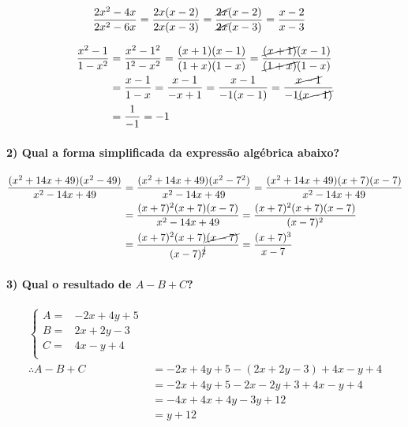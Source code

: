 \documentclass[pdftex, brazil, 12pt, oneside]{article}
\begin{document}
\begin{equation}
  \begin{split}
    \frac{2x^2 - 4x}{2x^2 - 6x} &= \frac{2x(x-2)}{2x(x-3)} = \frac{\cancel{2x}(x-2)}{\cancel{2x}(x-3)} = \frac{x-2}{x-3}
  \end{split}
\end{equation}

\begin{equation}
  \begin{split}
    \frac{x^2 - 1}{1- x^2} &= \frac{x^2 - 1^2}{1^2 - x^2} = \frac{(x+1)(x-1)}{(1+x)(1-x)} = \frac{\cancel{(x+1)}(x-1)}{\cancel{(1+x)}(1-x)}\\
                           &= \frac{x-1}{1-x} = \frac{x-1}{-x+1} = \frac{x-1}{-1(x-1)} = \frac{\cancel{x-1}}{-1\cancel{(x-1)}}\\
                           &= \frac{1}{-1} = -1
  \end{split}
\end{equation}

\paragraph{2) Qual a forma simplificada da expressão algébrica abaixo?}

\begin{equation}
  \begin{split}
    \frac{(x^2 + 14x + 49)(x^2 - 49)}{x^2 - 14x + 49} &= \frac{(x^2 + 14x + 49)(x^2 - 7^2)}{x^2 - 14x + 49}
    = \frac{(x^2 + 14x + 49)(x + 7)(x-7)}{x^2 - 14x + 49}\\
    &= \frac{(x+7)^2(x + 7)(x-7)}{x^2 - 14x + 49} = \frac{(x+7)^2(x + 7)(x-7)}{(x-7)^2}\\
    &= \frac{(x+7)^2(x + 7)\cancel{(x-7)}}{(x-7)^{\cancel{2}}} = \frac{(x+7)^3}{x-7}
  \end{split}
\end{equation}

\paragraph{3) Qual o resultado de $A - B + C$?}

\begin{equation}
  \begin{split}
    \begin{cases}
      A = & -2x + 4y + 5\\
      B = & 2x + 2y - 3\\
      C = & 4x - y + 4\\
    \end{cases}&\\
    \therefore A-B+C &= -2x + 4y + 5 - (2x + 2y - 3) + 4x - y + 4\\
    &= -2x + 4y + 5 -2x -2y +3  + 4x - y + 4\\
    &= -4x + 4x +4y - 3y + 12\\
    &= y + 12
  \end{split}
\end{equation}
\end{document}
